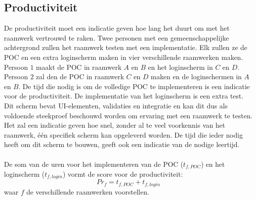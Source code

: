 \subsection{Productiviteit}
\label{sec:vergelijking-productiviteit}
De productiviteit moet een indicatie geven hoe lang het duurt om met het raamwerk vertrouwd te raken. 
Twee personen met een gemeenschappelijke achtergrond zullen het raamwerk testen met een implementatie.
Elk zullen ze de POC en een extra loginscherm maken in vier verschillende raamwerken maken.
Persoon $1$ maakt de POC in raamwerk $A$ en $B$ en het loginscherm in $C$ en $D$.
Persoon $2$ zal den de POC in raamwerk $C$ en $D$ maken en de loginschermen in $A$ en $B$.
De tijd die nodig is om de volledige POC te implementeren is een indicatie voor de productiviteit. 
De implementatie van het loginscherm is een extra test.
Dit scherm bevat UI-elementen, validaties en  integratie en kan dit dus als voldoende steekproef beschouwd worden om ervaring met een raamwerk te testen.
Het zal een indicatie geven hoe snel,  zonder al te veel voorkennis van het raamwerk,  één specifiek scherm kan opgeleverd worden.
De tijd die ieder nodig heeft om dit scherm te bouwen, geeft ook een indicatie van de nodige leertijd.
\paragraph{}
De som van de uren voor het implementeren van de POC ($t_{f,POC}$) en het loginscherm ($t_{f,login}$) vormt de score voor de productiviteit:
\begin{equation}
  Pr_f = {t_{f,POC} + t_{f,login}}
  \label{eq:productiviteit}
\end{equation}
waar $f$ de verschillende raamwerken voorstellen.

